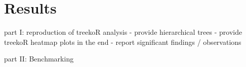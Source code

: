 

\chapter{Results}\label{sec:results}

part I: reproduction of treekoR analysis
- provide hierarchical trees
- provide treekoR heatmap plots in the end
- report significant findings / observations

part II: Benchmarking

\begin{knitrout}
\color{fgcolor}\begin{kframe}


{\ttfamily\noindent\itshape\color{messagecolor}{\#\# Loading required package: survival}}\end{kframe}
\end{knitrout}





\begin{knitrout}
\color{fgcolor}\begin{kframe}


{\ttfamily\noindent\color{warningcolor}{\#\# Warning in ncases * ncontrols: NAs produced by integer overflow}}\end{kframe}
\end{knitrout}


